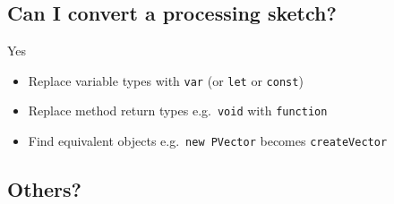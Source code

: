 \documentclass{article}[18pt]
\providecommand{\tightlist}{%
	\setlength{\itemsep}{0pt}\setlength{\parskip}{0pt}}
\begin{document}
\hypertarget{can-i-convert-a-processing-sketch}{%
	\subsection{Can I convert a processing
		sketch?}\label{can-i-convert-a-processing-sketch}}

Yes

\begin{itemize}
	\tightlist
	\item
	Replace variable types with \texttt{var} (or \texttt{let} or
	\texttt{const})
	\item
	Replace method return types e.g.~\texttt{void} with \texttt{function}
	\item
	Find equivalent objects e.g.~\texttt{new\ PVector} becomes
	\texttt{createVector}
\end{itemize}

\hypertarget{others}{%
	\subsection{Others?}\label{others}}
\end{document}

